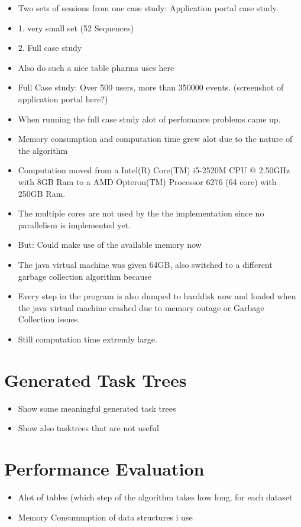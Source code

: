 \begin{itemize}
	\item Two sets of sessions from one case study: Application portal case study. 
	\item 1. very small set (52 Sequences)
	\item 2. Full case study
	\item Also do such a nice table pharms uses here
	\item Full Case study: Over 500 users, more than 350000 events. (screenshot of application portal here?)
	\item When running the full case study alot of perfomance problems came up.
	\item Memory consumption and computation time grew alot due to the nature of the algorithm
	\item Computation moved from a Intel(R) Core(TM) i5-2520M CPU @ 2.50GHz with 8GB Ram to a AMD Opteron(TM) Processor 6276 (64 core) with 250GB Ram.
	\item The multiple cores are not used by the the implementation since no parallelism is implemented yet.
	\item But: Could make use of the available memory now
	\item The java virtual machine was given 64GB, also switched to a different garbage collection algorithm because
	\item Every step in the program is also dumped to harddisk now and loaded when the java virtual machine crashed due to memory outage or Garbage Collection issues.
	\item Still computation time extremly large.
\end{itemize} 
\section{Generated Task Trees}
\begin{itemize}
	\item Show some meaningful generated task trees
	\item Show also tasktrees that are not useful
\end{itemize}
\section{Performance Evaluation}
\begin{itemize}
	\item Alot of tables (which step of the algorithm takes how long, for each dataset
	\item Memory Consummption of data structures i use
\end{itemize}


